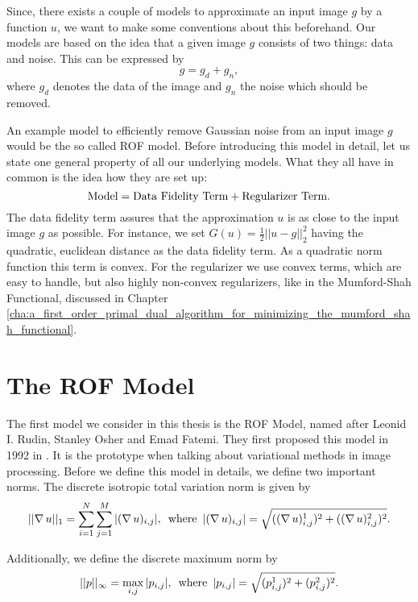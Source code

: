Since, there exists a couple of models to approximate an input image $g$ by a function $u$, we want to make some conventions about this beforehand. Our models are based on the idea that a given image $g$ consists of two things: data and noise. This can be expressed by
    $$
        g = g_{d} + g_{n},
    $$
where $g_{d}$ denotes the data of the image and $g_{n}$ the noise which should be removed.

An example model to efficiently remove Gaussian noise from an input image $g$ would be the so called ROF model. Before introducing this model in detail, let us state one general property of all our underlying models. What they all have in common is the idea how they are set up:
    $$
        \textnormal{Model} = \textnormal{Data Fidelity Term} + \textnormal{Regularizer Term}.
    $$
The data fidelity term assures that the approximation $u$ is as close to the input image $g$ as possible. For instance, we set $G(u) = \frac{1}{2} ||u - g||_{2}^{2}$ having the quadratic, euclidean distance as the data fidelity term. As a quadratic norm function this term is convex. For the regularizer we use convex terms, which are easy to handle, but also highly non-convex regularizers, like in the Mumford-Shah Functional, discussed in Chapter \ref{cha:a_first_order_primal_dual_algorithm_for_minimizing_the_mumford_shah_functional}.

\section{The ROF Model} %
\label{sec:the_rof_model}
    
    The first model we consider in this thesis is the ROF Model, named after Leonid I. Rudin, Stanley Osher and Emad Fatemi. They first proposed this model in 1992 in \cite{ROF}. It is the prototype when talking about variational methods in image processing. Before we define this model in details, we define two important norms. The discrete isotropic total variation norm is given by
        \begin{equation}
            ||\nabla \, u||_{1} = \sum_{i = 1}^{N} \sum_{j = 1}^{M} |(\nabla \, u)_{i, j}|, \,\,\, \textnormal{where} \,\,\, |(\nabla \, u)_{i, j}| = \sqrt{((\nabla \, u)^{1}_{i, j})^{2} + ((\nabla \, u)^{2}_{i, j})^{2}}.
        \label{eq:isotropic_total_variation_norm}
        \end{equation}

    Additionally, we define the discrete maximum norm by
        \begin{equation}
            ||p||_{\infty} = \max_{i, j} |p_{i, j}|, \,\,\, \textnormal{where} \,\,\, |p_{i, j}| = \sqrt{(p^{1}_{i, j})^{2} + (p^{2}_{i, j})^{2}}.
        \end{equation}

